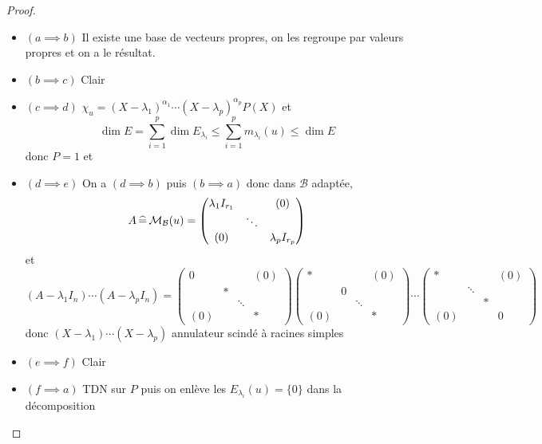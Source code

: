 \begin{proof}~
    \begin{itemize}
        \item $(a\implies b)$ Il existe une base de vecteurs propres, on les regroupe par valeurs propres et on a le résultat.
        \item $(b\implies c)$ Clair
        \item $(c\implies d)$ $\chi_u=(X-\lambda_1)^{\alpha_1}\cdots (X-\lambda_p)^{\alpha_p}P(X)$ et \[
                \dim E=\sum_{i=1}^p\dim E_{\lambda_i}\leq \sum_{i=1}^pm_{\lambda_i}(u)\leq \dim E
            \]
            donc $P=1$ et \conc
        \item $(d\implies e)$ On a $(d\implies b)$ puis $(b\implies a)$ donc dans $\mathcal B$ adaptée, \[
                A\,\widehat=\,\mathcal M_{\mathcal B}(u)= \begin{pmatrix}
                    \lambda_1 I_{r_1} &  & (0) \\
                     & \ddots & \\
                    (0) & & \lambda_p I_{r_p}
                \end{pmatrix}
            \]
            et \[ (A-\lambda_1 I_n)\cdots (A-\lambda_p I_n) =
                \begin{pmatrix}
                0 & & & (0) \\
                  &*& & \\
                  & &\ddots &\\
                (0) & & & *
            \end{pmatrix}
                \begin{pmatrix}
                * & & & (0) \\
                  &0& & \\
                  & &\ddots &\\
                (0) & & & *
            \end{pmatrix}\cdots
            \begin{pmatrix}
                * & & & (0) \\
                  &\ddots& & \\
                  & &* &\\
                (0) & & & 0
            \end{pmatrix}
        \]
        donc $(X-\lambda_1)\cdots (X-\lambda_p)$ annulateur scindé à racines simples
    \item $(e\implies f)$ Clair
    \item $(f\implies a)$ TDN sur $P$ puis on enlève les $E_{\lambda_i}(u)=\{0\}$ dans la décomposition
    \end{itemize}
\end{proof}

